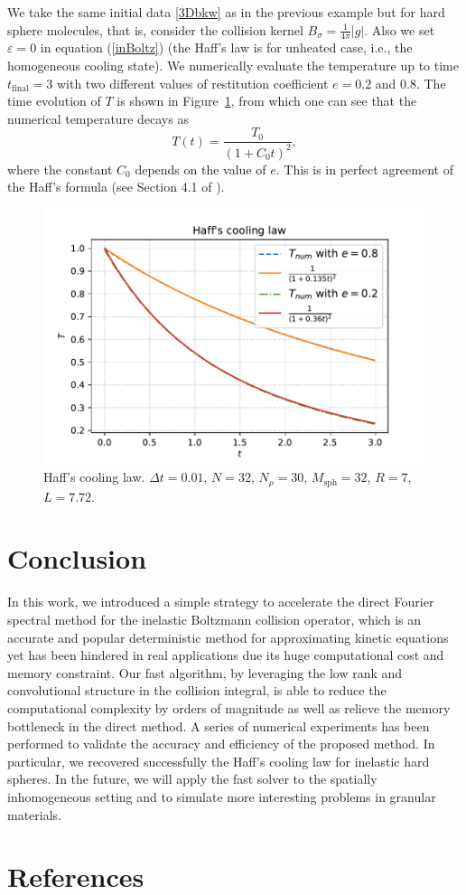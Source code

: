 \documentclass[review, times]{elsarticle}
\begin{document}
We take the same initial data \eqref{3Dbkw} as in the previous example but for hard sphere molecules, that is, consider the collision kernel $B_{\sigma} = \frac{1}{4\pi}|g|$. Also we set $\varepsilon=0$ in equation (\ref{inBoltz}) (the Haff's law is for unheated case, i.e., the homogeneous cooling state). We numerically evaluate the temperature up to time $t_\text{final}=3$ with two different values of restitution coefficient $e=0.2$ and $0.8$. The time evolution of $T$ is shown in Figure~\ref{Haff_cooling}, from which one can see that the numerical temperature decays as 
\begin{equation}
T(t) = \frac{T_0}{(1+C_0 t)^2},
\end{equation}
where the constant $C_0$ depends on the value of $e$. This is in perfect agreement of the Haff's formula (see Section 4.1 of \cite{NE}).

\begin{figure}[htp!]
  \centering
  \includegraphics[width = .8\linewidth]{Haff's_cooling}
  \caption{Haff's cooling law. $\Delta t=0.01$, $N=32$, $N_{\rho}=30$, $M_{\text{sph}}=32$, $R=7$, $L=7.72$.}
  \label{Haff_cooling}
\end{figure}


\section{Conclusion}

In this work, we introduced a simple strategy to accelerate the direct Fourier spectral method for the inelastic Boltzmann collision operator, which is an accurate and popular deterministic method for approximating kinetic equations yet has been hindered in real applications due its huge computational cost and memory constraint. Our fast algorithm, by leveraging the low rank and convolutional structure in the collision integral, is able to reduce the computational complexity by orders of magnitude as well as relieve the memory bottleneck in the direct method. A series of numerical experiments has been performed to validate the accuracy and efficiency of the proposed method. In particular, we recovered successfully the Haff's cooling law for inelastic hard spheres. In the future, we will apply the fast solver to the spatially inhomogeneous setting and to simulate more interesting problems in granular materials.




\section*{References}


\end{document}
